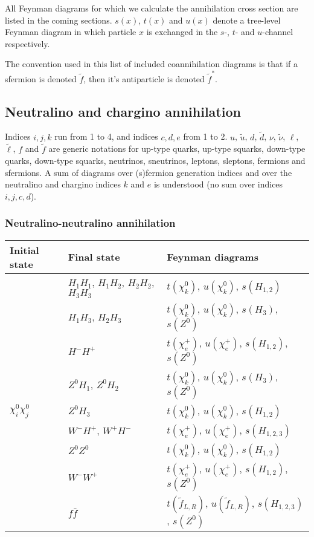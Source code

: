 All Feynman diagrams for which we calculate the 
annihilation cross section are listed in the coming sections.
$s(x)$, $t(x)$ and $u(x)$ denote a
tree-level Feynman diagram in which particle $x$ is exchanged in
the $s$-, $t$- and $u$-channel respectively. 

The convention used in this list of included coannihilation diagrams is that if a sfermion is
denoted $\tilde{f}$, then it's antiparticle is denoted $\tilde{f}^*$.

\subsection{Neutralino and chargino annihilation}

Indices $i,j,k$ run
from 1 to 4, and indices $c,d,e$ from 1 to 2.  $u$, $\tilde{u}$,
$d$, $\tilde{d}$, $\nu$, $\tilde{\nu}$, $\ell$, $\tilde{\ell}$,
$f$ and $\tilde{f}$ are generic notations for up-type quarks,
up-type squarks, down-type quarks, down-type squarks, neutrinos,
sneutrinos, leptons, sleptons, fermions and sfermions.  A sum of
diagrams over (s)fermion generation indices and over the
neutralino and chargino indices $k$ and $e$ is understood (no sum
over indices $i,j,c,d$).

\subsubsection{Neutralino-neutralino annihilation}

\begin{center}  
\begin{tabular}{lll} \hline 
  Initial state & Final state & Feynman diagrams \\ \hline \tabspace
   & $H_1 H_1$, $H_1 H_2$, $H_2 H_2$, $H_3 H_3$ &
  $t(\chi_k^0)$, $u(\chi_k^0)$, $s(H_{1,2})$ \\
   & $H_1 H_3$, $H_2 H_3$ &
  $t(\chi_k^0)$, $u(\chi_k^0)$, $s(H_{3})$, $s(Z^0)$ \\
   & $H^- H^+$ &
  $t(\chi_e^+)$, $u(\chi_e^+)$, $s(H_{1,2})$, $s(Z^0)$ \\
   & $Z^0 H_1$, $Z^0 H_2$ &
  $t(\chi_k^0)$, $u(\chi_k^0)$, $s(H_{3})$, $s(Z^0)$ \\
  $\chi_i^0 \chi_j^0$ & $Z^0 H_3$ &
  $t(\chi_k^0)$, $u(\chi_k^0)$, $s(H_{1,2})$ \\
   & $W^- H^+$, $W^+ H^-$ &
  $t(\chi_e^+)$, $u(\chi_e^+)$, $s(H_{1,2,3})$ \\
   & $Z^0 Z^0$ &
  $t(\chi_k^0)$, $u(\chi_k^0)$, $s(H_{1,2})$ \\
   & $W^- W^+$ &
  $t(\chi_e^+)$, $u(\chi_e^+)$, $s(H_{1,2})$, $s(Z^0)$ \\
   & $f \bar{f}$ &
  $t(\tilde{f}_{L,R})$, $u(\tilde{f}_{L,R})$, $s(H_{1,2,3})$,
  $s(Z^0)$ \\ \hline  
\end{tabular}
\end{center}


